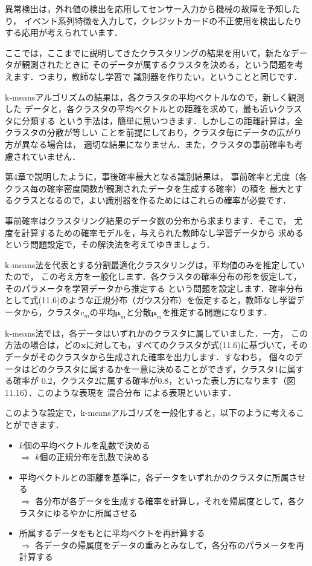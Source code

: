 異常検出は，外れ値の検出を応用してセンサー入力から機械の故障を予知したり，
イベント系列特徴を入力して，クレジットカードの不正使用を検出したりする応用が考えられています．


ここでは，ここまでに説明してきたクラスタリングの結果を用いて，新たなデータが観測されたときに
そのデータが属するクラスタを決める，という問題を考えます．つまり，教師なし学習で
識別器を作りたい，ということと同じです．

k-meansアルゴリズムの結果は，各クラスタの平均ベクトルなので，新しく観測した
データと，各クラスタの平均ベクトルとの距離を求めて，最も近いクラスタに分類する
という手法は，簡単に思いつきます．しかしこの距離計算は，全クラスタの分散が等しい
ことを前提にしており，クラスタ毎にデータの広がり方が異なる場合は，
適切な結果になりません．また，クラスタの事前確率も考慮されていません．

第4章で説明したように，事後確率最大となる識別結果は，
事前確率と尤度（各クラス毎の確率密度関数が観測されたデータを生成する確率）の積を
最大とするクラスとなるので，よい識別器を作るためにはこれらの確率が必要です．

事前確率はクラスタリング結果のデータ数の分布から求まります．そこで，
尤度を計算するための確率モデルを，与えられた教師なし学習データから
求めるという問題設定で，その解決法を考えてゆきましょう．

k-means法を代表とする分割最適化クラスタリングは，平均値のみを推定していたので，
この考え方を一般化します．各クラスタの確率分布の形を仮定して，そのパラメータを学習データから推定する
という問題を設定します．確率分布として式(11.6)のような正規分布（ガウス分布）を仮定すると，教師なし学習データから，クラスタ$c_m$の平均$\bm{\mu}_m$と分散$\bm{\mu}_m$を推定する問題になります．

k-means法では，各データはいずれかのクラスタに属していました．一方，
この方法の場合は，どの$\bm{x}$に対しても，すべてのクラスタが式(11.6)に基づいて，そのデータがそのクラスタから生成された確率を出力します．すなわち，
個々のデータはどのクラスタに属するかを一意に決めることができず，クラスタ1に属する確率が
0.2，クラスタ2に属する確率が0.8，といった表し方になります（図11.16）．このような表現を
混合分布
による表現といいます．


このような設定で，k-meansアルゴリズを一般化すると，以下のように考えることができます．

\begin{itemize}
\item $k$個の平均ベクトルを乱数で決める\\
 $\Rightarrow$ $k$個の正規分布を乱数で決める
\item 平均ベクトルとの距離を基準に，各データをいずれかのクラスタに所属させる\\
 $\Rightarrow$ 各分布が各データを生成する確率を計算し，それを帰属度として，各クラスタにゆるやかに所属させる
\item 所属するデータをもとに平均ベクトを再計算する\\
 $\Rightarrow$ 各データの帰属度をデータの重みとみなして，各分布のパラメータを再計算する
\end{itemize}

